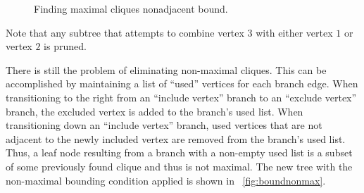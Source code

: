\begin{figure}[H]
  \centering
  \caption{Finding maximal cliques nonadjacent bound.}
  \label{fig:boundnonadj}
\end{figure}

Note that any subtree that attempts to combine vertex \(3\) with either vertex \(1\) or vertex \(2\) is pruned.

There is still the problem of eliminating non-maximal cliques.  This can be accomplished by maintaining a list of
``used'' vertices for each branch edge.  When transitioning to the right from an ``include vertex'' branch to an
``exclude vertex'' branch, the excluded vertex is added to the branch's used list.  When transitioning down an
``include vertex'' branch, used vertices that are not adjacent to the newly included vertex are removed from the
branch's used list.  Thus, a leaf node resulting from a branch with a non-empty used list is a subset of some
previously found clique and thus is not maximal.  The new tree with the non-maximal bounding condition applied is
shown in \figurename~\ref{fig:boundnonmax}.

